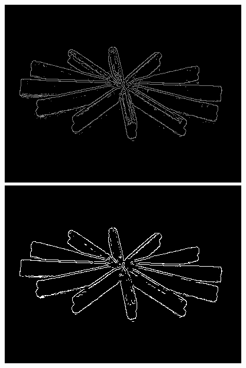 \documentclass[notheorems,serif,table,compress]{beamer}  %
\begin{document}
\begin{frame}
\begin{figure}
\begin{minipage}[t]{0.22\linewidth}
        \end{minipage}
        \begin{minipage}[t]{0.22\linewidth}
            \includegraphics[width=1\linewidth]{nonResult.png} 
        \end{minipage}
        \begin{minipage}[t]{0.22\linewidth}
            \includegraphics[width=1\linewidth]{cannyResult.png} 
        \end{minipage}
    \end{figure}
\end{frame}
\end{document}
